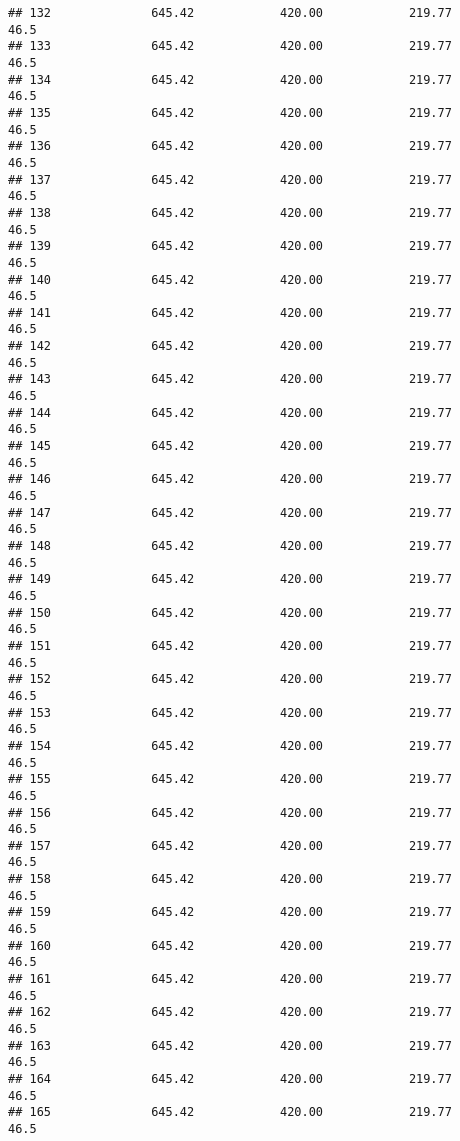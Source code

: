\documentclass[]{article}
\begin{document}
\begin{verbatim}
## 132              645.42            420.00            219.77           46.5
## 133              645.42            420.00            219.77           46.5
## 134              645.42            420.00            219.77           46.5
## 135              645.42            420.00            219.77           46.5
## 136              645.42            420.00            219.77           46.5
## 137              645.42            420.00            219.77           46.5
## 138              645.42            420.00            219.77           46.5
## 139              645.42            420.00            219.77           46.5
## 140              645.42            420.00            219.77           46.5
## 141              645.42            420.00            219.77           46.5
## 142              645.42            420.00            219.77           46.5
## 143              645.42            420.00            219.77           46.5
## 144              645.42            420.00            219.77           46.5
## 145              645.42            420.00            219.77           46.5
## 146              645.42            420.00            219.77           46.5
## 147              645.42            420.00            219.77           46.5
## 148              645.42            420.00            219.77           46.5
## 149              645.42            420.00            219.77           46.5
## 150              645.42            420.00            219.77           46.5
## 151              645.42            420.00            219.77           46.5
## 152              645.42            420.00            219.77           46.5
## 153              645.42            420.00            219.77           46.5
## 154              645.42            420.00            219.77           46.5
## 155              645.42            420.00            219.77           46.5
## 156              645.42            420.00            219.77           46.5
## 157              645.42            420.00            219.77           46.5
## 158              645.42            420.00            219.77           46.5
## 159              645.42            420.00            219.77           46.5
## 160              645.42            420.00            219.77           46.5
## 161              645.42            420.00            219.77           46.5
## 162              645.42            420.00            219.77           46.5
## 163              645.42            420.00            219.77           46.5
## 164              645.42            420.00            219.77           46.5
## 165              645.42            420.00            219.77           46.5

\end{verbatim}
\end{document}
